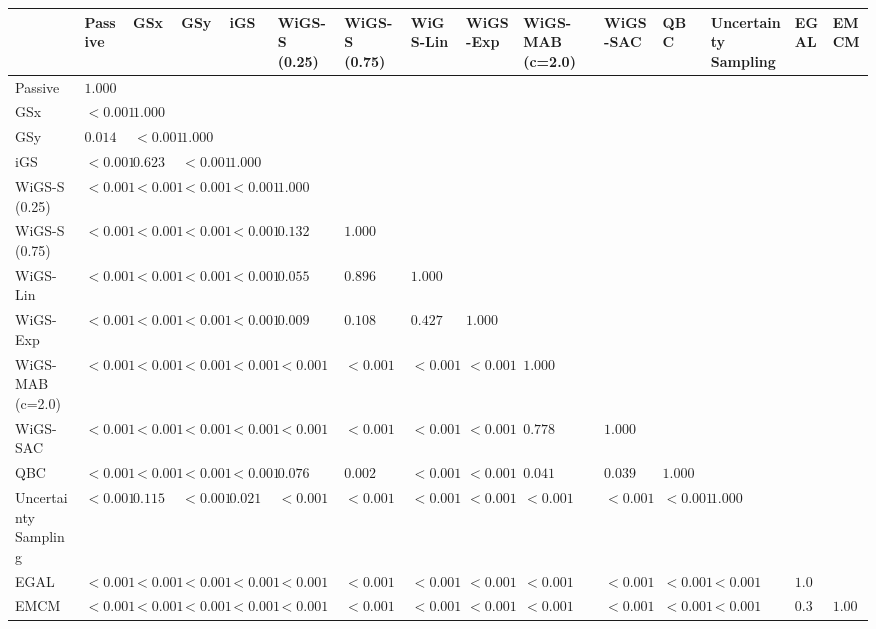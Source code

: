 \begin{tabular}{lllllllllllllll}
\toprule
 & Passive & GSx & GSy & iGS & WiGS-S (0.25) & WiGS-S (0.75) & WiGS-Lin & WiGS-Exp & WiGS-MAB (c=2.0) & WiGS-SAC & QBC & Uncertainty Sampling & EGAL & EMCM \\
\midrule
Passive & $1.000$ &  &  &  &  &  &  &  &  &  &  &  &  &  \\
GSx & $<0.001$ & $1.000$ &  &  &  &  &  &  &  &  &  &  &  &  \\
GSy & $0.014$ & $<0.001$ & $1.000$ &  &  &  &  &  &  &  &  &  &  &  \\
iGS & $<0.001$ & $0.623$ & $<0.001$ & $1.000$ &  &  &  &  &  &  &  &  &  &  \\
WiGS-S (0.25) & $<0.001$ & $<0.001$ & $<0.001$ & $<0.001$ & $1.000$ &  &  &  &  &  &  &  &  &  \\
WiGS-S (0.75) & $<0.001$ & $<0.001$ & $<0.001$ & $<0.001$ & $0.132$ & $1.000$ &  &  &  &  &  &  &  &  \\
WiGS-Lin & $<0.001$ & $<0.001$ & $<0.001$ & $<0.001$ & $0.055$ & $0.896$ & $1.000$ &  &  &  &  &  &  &  \\
WiGS-Exp & $<0.001$ & $<0.001$ & $<0.001$ & $<0.001$ & $0.009$ & $0.108$ & $0.427$ & $1.000$ &  &  &  &  &  &  \\
WiGS-MAB (c=2.0) & $<0.001$ & $<0.001$ & $<0.001$ & $<0.001$ & $<0.001$ & $<0.001$ & $<0.001$ & $<0.001$ & $1.000$ &  &  &  &  &  \\
WiGS-SAC & $<0.001$ & $<0.001$ & $<0.001$ & $<0.001$ & $<0.001$ & $<0.001$ & $<0.001$ & $<0.001$ & $0.778$ & $1.000$ &  &  &  &  \\
QBC & $<0.001$ & $<0.001$ & $<0.001$ & $<0.001$ & $0.076$ & $0.002$ & $<0.001$ & $<0.001$ & $0.041$ & $0.039$ & $1.000$ &  &  &  \\
Uncertainty Sampling & $<0.001$ & $0.115$ & $<0.001$ & $0.021$ & $<0.001$ & $<0.001$ & $<0.001$ & $<0.001$ & $<0.001$ & $<0.001$ & $<0.001$ & $1.000$ &  &  \\
EGAL & $<0.001$ & $<0.001$ & $<0.001$ & $<0.001$ & $<0.001$ & $<0.001$ & $<0.001$ & $<0.001$ & $<0.001$ & $<0.001$ & $<0.001$ & $<0.001$ & $1.000$ &  \\
EMCM & $<0.001$ & $<0.001$ & $<0.001$ & $<0.001$ & $<0.001$ & $<0.001$ & $<0.001$ & $<0.001$ & $<0.001$ & $<0.001$ & $<0.001$ & $<0.001$ & $0.350$ & $1.000$ \\
\bottomrule
\end{tabular}
